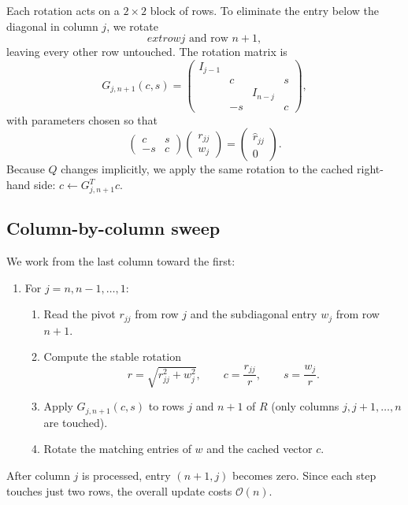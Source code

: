 \documentclass[letterpaper, 12pt]{article}
\begin{document}
Each rotation acts on a $2\times 2$ block of rows. To eliminate the entry below the diagonal in column $j$, we rotate
\[
    	ext{row } j \text{ and row } n+1,
\]
leaving every other row untouched. The rotation matrix is
\[
    G_{j,n+1}(c,s) = \begin{pmatrix}
        I_{j-1} &              &             &             \\
                 &  c          &             &  s          \\
                 &             & I_{n-j}     &             \\
                 & -s          &             &  c
    \end{pmatrix},
\]
with parameters chosen so that
\[
    \begin{pmatrix}
        c & s \\
        -s & c
    \end{pmatrix}
    \begin{pmatrix}
        r_{jj} \\
        w_j
    \end{pmatrix}
    =
    \begin{pmatrix}
        \hat{r}_{jj} \\
        0
    \end{pmatrix}.
\]
Because $Q$ changes implicitly, we apply the same rotation to the cached right-hand side: $c \leftarrow G_{j,n+1}^T c$.

\subsection*{Column-by-column sweep}

We work from the last column toward the first:
\begin{enumerate}
    \item For $j = n, n-1, \ldots, 1$:
    \begin{enumerate}
        \item Read the pivot $r_{jj}$ from row $j$ and the subdiagonal entry $w_j$ from row $n+1$.
        \item Compute the stable rotation
        \[
            r = \sqrt{r_{jj}^2 + w_j^2}, \qquad c = \frac{r_{jj}}{r}, \qquad s = \frac{w_j}{r}.
        \]
        \item Apply $G_{j,n+1}(c,s)$ to rows $j$ and $n+1$ of $R$ (only columns $j, j+1, \ldots, n$ are touched).
        \item Rotate the matching entries of $w$ and the cached vector $c$.
    \end{enumerate}
\end{enumerate}
After column $j$ is processed, entry $(n+1, j)$ becomes zero. Since each step touches just two rows, the overall update costs $\mathcal{O}(n)$.
\end{document}
